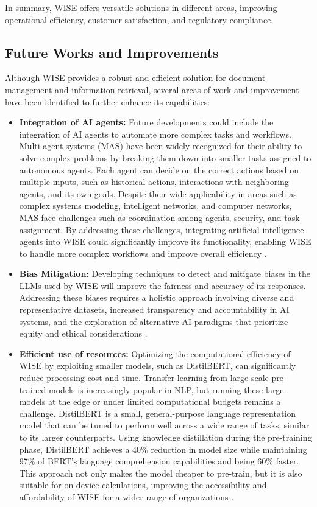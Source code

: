 In summary, WISE offers versatile solutions in different areas, improving operational efficiency, customer satisfaction, and regulatory compliance.

\subsection{Future Works and Improvements}

Although WISE provides a robust and efficient solution for document management and information retrieval, several areas of work and improvement have been identified to further enhance its capabilities:

\begin{itemize}
    \item \textbf{Integration of AI agents:} Future developments could include the integration of AI agents to automate more complex tasks and workflows. Multi-agent systems (MAS) have been widely recognized for their ability to solve complex problems by breaking them down into smaller tasks assigned to autonomous agents. Each agent can decide on the correct actions based on multiple inputs, such as historical actions, interactions with neighboring agents, and its own goals. Despite their wide applicability in areas such as complex systems modeling, intelligent networks, and computer networks, MAS face challenges such as coordination among agents, security, and task assignment. By addressing these challenges, integrating artificial intelligence agents into WISE could significantly improve its functionality, enabling WISE to handle more complex workflows and improve overall efficiency \cite{dorri2018multi}.

    \item \textbf{Bias Mitigation:} Developing techniques to detect and mitigate biases in the LLMs used by WISE will improve the fairness and accuracy of its responses. Addressing these biases requires a holistic approach involving diverse and representative datasets, increased transparency and accountability in AI systems, and the exploration of alternative AI paradigms that prioritize equity and ethical considerations \cite{ferrara2023fairness}.

    \item \textbf{Efficient use of resources:} Optimizing the computational efficiency of WISE by exploiting smaller models, such as DistilBERT, can significantly reduce processing cost and time. Transfer learning from large-scale pre-trained models is increasingly popular in NLP, but running these large models at the edge or under limited computational budgets remains a challenge. DistilBERT is a small, general-purpose language representation model that can be tuned to perform well across a wide range of tasks, similar to its larger counterparts. Using knowledge distillation during the pre-training phase, DistilBERT achieves a 40\% reduction in model size while maintaining 97\% of BERT's language comprehension capabilities and being 60\% faster. This approach not only makes the model cheaper to pre-train, but it is also suitable for on-device calculations, improving the accessibility and affordability of WISE for a wider range of organizations \cite{sanh2019distilbert}.
\end{itemize}

